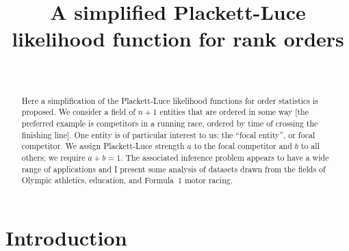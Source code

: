 \documentclass[sts]{imsart}
\begin{document}
\begin{frontmatter}
\title{A simplified Plackett-Luce likelihood function for rank orders}

\begin{aug}
\author[A]{~}
\address[A]{University of Stirling.}
\end{aug}

\begin{abstract}

Here a simplification of the Plackett-Luce likelihood functions for
order statistics is proposed.  We consider a field of $n+1$ entities
that are ordered in some way [the preferred example is competitors in
  a running race, ordered by time of crossing the finishing line].
One entity is of particular interest to us: the ``focal entity'', or
focal competitor.  We assign Plackett-Luce strength $a$ to the focal
competitor and $b$ to all others; we require $a+b=1$.  The associated
inference problem appears to have a wide range of applications and I
present some analysis of datasets drawn from the fields of Olympic
athletics, education, and Formula~1 motor racing.
\end{abstract}

\begin{keyword}
\end{keyword}

\end{frontmatter}


\section{Introduction}
\end{document}

